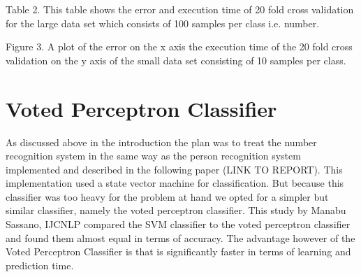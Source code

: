 \documentclass[%
        compressed,
        final,
        notitlepage,
        narroweqnarray,
        inline,
        twoside,
        ]{ieee}
\begin{document}

Table 2. This table shows the error and execution time of 20 fold cross validation for the large data set which consists of 100 samples per class i.e. number.


Figure 3. A plot of the error on the x axis the execution time of the 20 fold cross validation on the y axis of the small data set consisting of 10 samples per class.


\section{Voted Perceptron Classifier}
As discussed above in the introduction the plan was to treat the number recognition system in the same way as the person recognition system implemented and described in the following paper  (LINK TO REPORT). This implementation used a state vector machine for classification. But because this classifier was too heavy for the problem at hand we opted for a simpler but similar classifier, namely the voted perceptron classifier. This study by Manabu Sassano, IJCNLP compared the SVM classifier to the voted perceptron classifier and found them almost equal in terms of accuracy. The advantage however of the Voted Perceptron Classifier is that is significantly faster in terms of learning and prediction time.
\end{document}
